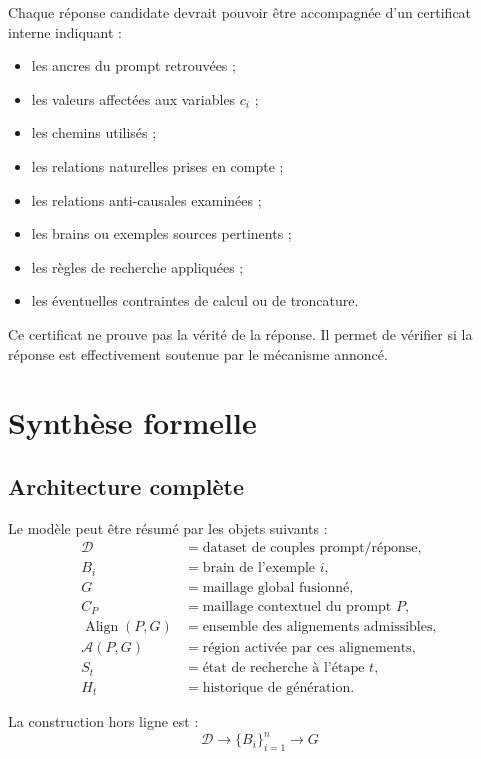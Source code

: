 \documentclass[11pt,a4paper]{report}
\theoremstyle{definition}
\theoremstyle{plain}
\theoremstyle{remark}
\newcommand{\D}{\mathcal{D}}
\newcommand{\A}{\mathcal{A}}
\newcommand{\Align}{\operatorname{Align}}
\begin{document}
Chaque réponse candidate devrait pouvoir être accompagnée d'un
certificat interne indiquant :
\begin{itemize}
  \item les ancres du prompt retrouvées ;
  \item les valeurs affectées aux variables \(c_i\) ;
  \item les chemins utilisés ;
  \item les relations naturelles prises en compte ;
  \item les relations anti-causales examinées ;
  \item les brains ou exemples sources pertinents ;
  \item les règles de recherche appliquées ;
  \item les éventuelles contraintes de calcul ou de troncature.
\end{itemize}

Ce certificat ne prouve pas la vérité de la réponse. Il permet
de vérifier si la réponse est effectivement soutenue par le
mécanisme annoncé.

\chapter{Synthèse formelle}

\section{Architecture complète}

Le modèle peut être résumé par les objets suivants :
\[
\begin{aligned}
\D&=\text{dataset de couples prompt/réponse},\\
B_i&=\text{brain de l'exemple }i,\\
G&=\text{maillage global fusionné},\\
C_P&=\text{maillage contextuel du prompt }P,\\
\Align(P,G)&=\text{ensemble des alignements admissibles},\\
\A(P,G)&=\text{région activée par ces alignements},\\
S_t&=\text{état de recherche à l'étape }t,\\
H_t&=\text{historique de génération}.
\end{aligned}
\]

La construction hors ligne est :
\[
\boxed{
\D
\longrightarrow
\{B_i\}_{i=1}^{n}
\longrightarrow
G
}
\]
\end{document}
